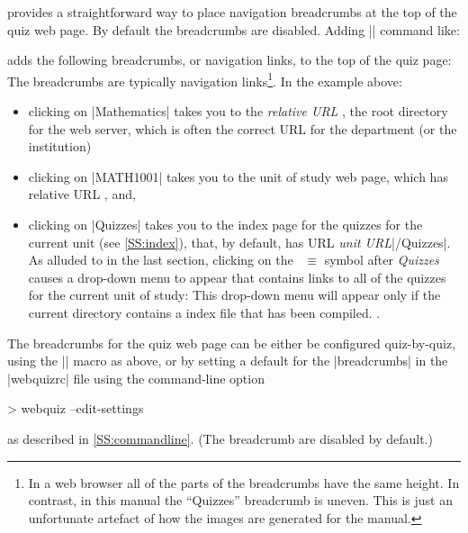 \documentclass[svgnames]{article}
\makeatletter
\newcommand\macroIndex[1]{%
  \lowercase{\def\temp{#1}}%
  \expandafter\index\expandafter{\temp@\textbackslash#1}%
}
\newcommand\webquizrc{\index{webquizrc}\BashCode|webquizrc|\xspace}
\makeatother
\begin{document}
  \WebQuiz provides a straightforward way to place navigation breadcrumbs
  at the top of the quiz web page. By default the
  breadcrumbs are disabled. Adding \LatexCode|\BreadCrumbs| command
  like:
  \begin{latexcode}
  \end{latexcode}
  adds the following breadcrumbs, or navigation links,
  to the top of the quiz page:
  The breadcrumbs are typically navigation links\footnote{In a web browser all of the
  parts of the breadcrumbs have the same height. In contrast, in this
  manual the ``Quizzes'' breadcrumb is uneven. This is just an
  unfortunate artefact of how the images are generated for the manual.}.
  In the example above:
  \begin{itemize}
    \item clicking on \BashCode|Mathematics| takes you to the
    \textit{relative URL} \BashCode{/}, the root directory for the web
    server, which is often the correct URL for the department (or the
    institution)
    \item clicking on
    \BashCode|MATH1001| takes you to the
    unit of study web page, which has relative URL , and,
    \item clicking on \BashCode|Quizzes| takes you to the index page for
    the quizzes for the current unit (see \autoref{SS:index}), that, by
    default, has URL \textit{unit URL}\BashCode|/Quizzes|.  As alluded
    to in the last section, clicking on the~{\large\color{red} $\equiv$}
    symbol after \textit{Quizzes} causes a drop-down menu to appear that
    contains links to all of the quizzes for the current unit of study:
    This drop-down menu  will appear only if the current directory
    contains a \WebQuiz index file that has been compiled.
    .
  \end{itemize}
  The breadcrumbs for the quiz web page can be either be configured
  quiz-by-quiz, using the \LatexCode|\BreadCrumbs| macro
  \macroIndex{BreadCrumbs} as above, or by setting a default for the
  \LatexCode|breadcrumbs|  in the \webquizrc file using the
  command-line option
  \begin{bashcode}
    > webquiz --edit-settings
  \end{bashcode}
  as described in \autoref{SS:commandline}.
  (The breadcrumb are disabled by default.)
\end{document}
